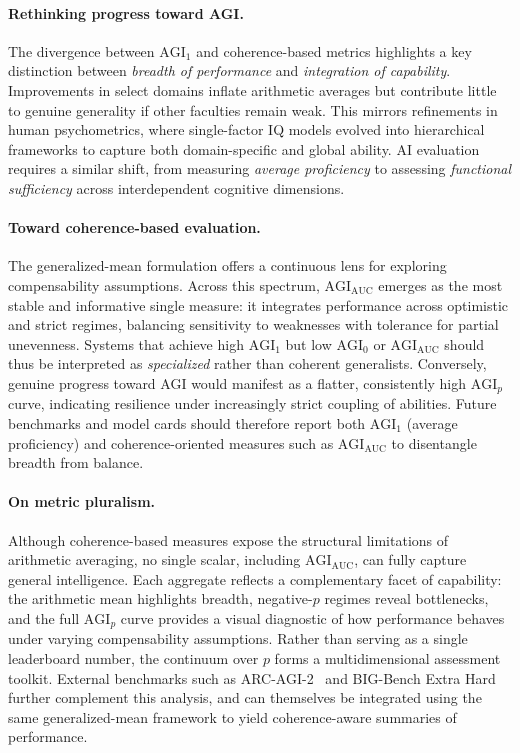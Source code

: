 \documentclass{article}
\begin{document}
\paragraph{Rethinking progress toward AGI.}
The divergence between \(\mathrm{AGI}_1\) and coherence-based metrics highlights a key distinction between 
\emph{breadth of performance} and \emph{integration of capability}.  
Improvements in select domains inflate arithmetic averages but contribute little to genuine generality 
if other faculties remain weak. This mirrors refinements in human psychometrics, 
where single-factor IQ models evolved into hierarchical frameworks 
\citep{carroll1993human,mcgrew2009chc,mcgrew2023carroll} 
to capture both domain-specific and global ability.  
AI evaluation requires a similar shift, from measuring \emph{average proficiency} 
to assessing \emph{functional sufficiency} across interdependent cognitive dimensions.

\paragraph{Toward coherence-based evaluation.}
The generalized-mean formulation offers a continuous lens for exploring compensability assumptions.  
Across this spectrum, \(\mathrm{AGI}_{\text{AUC}}\) emerges as the most stable and informative single measure: 
it integrates performance across optimistic and strict regimes, balancing sensitivity to weaknesses 
with tolerance for partial unevenness.  
Systems that achieve high \(\mathrm{AGI}_1\) but low \(\mathrm{AGI}_0\) or \(\mathrm{AGI}_{\text{AUC}}\) 
should thus be interpreted as \emph{specialized} rather than coherent generalists.  
Conversely, genuine progress toward AGI would manifest as a flatter, consistently high \(\mathrm{AGI}_p\) curve, 
indicating resilience under increasingly strict coupling of abilities.  
Future benchmarks and model cards should therefore report both 
\(\mathrm{AGI}_1\) (average proficiency) and coherence-oriented measures 
such as \(\mathrm{AGI}_{\text{AUC}}\) 
to disentangle breadth from balance.

\paragraph{On metric pluralism.}
Although coherence-based measures expose the structural limitations of arithmetic averaging, no single scalar, including $\mathrm{AGI}_{\mathrm{AUC}}$, can fully capture general intelligence. Each aggregate reflects a complementary facet of capability: the arithmetic mean highlights breadth, negative-$p$ regimes reveal bottlenecks, and the full $\mathrm{AGI}_p$ curve provides a visual diagnostic of how performance behaves under varying compensability assumptions. Rather than serving as a single leaderboard number, the continuum over $p$ forms a multidimensional assessment toolkit. External benchmarks such as ARC-AGI-2~\citep{chollet2025arc} and BIG-Bench Extra Hard~\citep{kazemi2025big} further complement this analysis, and can themselves be integrated using the same generalized-mean framework to yield coherence-aware summaries of performance.
\end{document}
